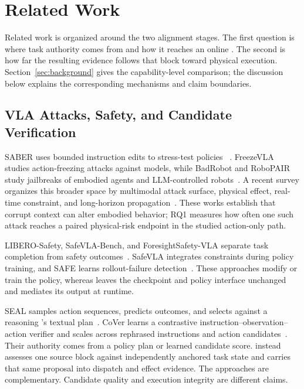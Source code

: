 \section{Related Work}
\label{sec:related}

Related work is organized around the two alignment stages.  The first question
is where task authority comes from and how it reaches an online \actionblock.
The second is how far the resulting evidence follows that block toward physical
execution.  Section~\ref{sec:background} gives the capability-level comparison;
the discussion below explains the corresponding mechanisms and claim
boundaries.

\subsection{VLA Attacks, Safety, and Candidate Verification}

SABER uses bounded instruction edits to stress-test \vla policies
~\cite{saber2026}.  FreezeVLA studies action-freezing attacks against \vla
models, while BadRobot and RoboPAIR study jailbreaks of embodied agents and
LLM-controlled robots~\cite{freezevla2025,badrobot2025,robopair2025}.  A recent
survey organizes this broader space by multimodal attack surface, physical
effect, real-time constraint, and long-horizon propagation~\cite{vlasafety2026}.
These works establish that corrupt context can alter embodied behavior; RQ1
measures how often one such attack reaches a paired physical-risk endpoint in the
studied action-only path.

LIBERO-Safety, SafeVLA-Bench, and ForesightSafety-VLA separate task completion
from safety outcomes~\cite{liberosafety2026,safevlabench2026,
foresightsafety2026}.  SafeVLA integrates constraints during policy training,
and SAFE learns rollout-failure detection~\cite{safevla2025,safe2025}.  These
approaches modify or train the policy, whereas \system leaves the checkpoint and
policy interface unchanged and mediates its output at runtime.

SEAL samples action sequences, predicts outcomes, and selects against a
reasoning \vla's textual plan~\cite{sealvla2026}.  CoVer learns a contrastive
instruction--observation--action verifier and scales across rephrased
instructions and action candidates~\cite{covervla2026}.  Their authority comes
from a policy plan or learned candidate score.  \system instead assesses one
source block against independently anchored task state and carries that same
proposal into dispatch and effect evidence.  The approaches are complementary.
Candidate quality and execution integrity are different claims.

